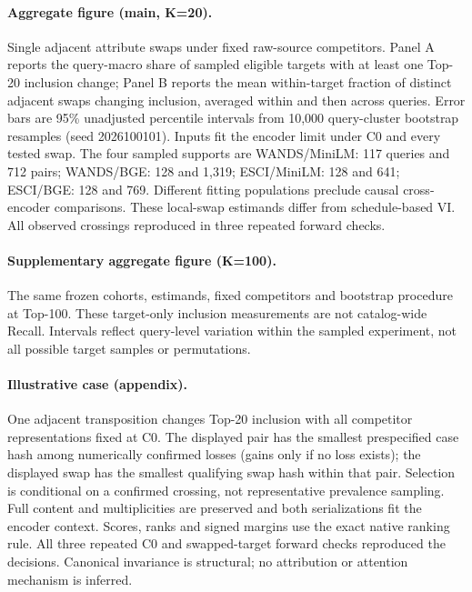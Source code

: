 \paragraph{Aggregate figure (main, K=20).}
Single adjacent attribute swaps under fixed raw-source competitors. Panel A reports the query-macro share of sampled eligible targets with at least one Top-20 inclusion change; Panel B reports the mean within-target fraction of distinct adjacent swaps changing inclusion, averaged within and then across queries. Error bars are 95\% unadjusted percentile intervals from 10,000 query-cluster bootstrap resamples (seed 2026100101). Inputs fit the encoder limit under C0 and every tested swap. The four sampled supports are WANDS/MiniLM: 117 queries and 712 pairs; WANDS/BGE: 128 and 1,319; ESCI/MiniLM: 128 and 641; ESCI/BGE: 128 and 769. Different fitting populations preclude causal cross-encoder comparisons. These local-swap estimands differ from schedule-based VI. All observed crossings reproduced in three repeated forward checks.

\paragraph{Supplementary aggregate figure (K=100).}
The same frozen cohorts, estimands, fixed competitors and bootstrap procedure at Top-100. These target-only inclusion measurements are not catalog-wide Recall. Intervals reflect query-level variation within the sampled experiment, not all possible target samples or permutations.

\paragraph{Illustrative case (appendix).}
One adjacent transposition changes Top-20 inclusion with all competitor representations fixed at C0. The displayed pair has the smallest prespecified case hash among numerically confirmed losses (gains only if no loss exists); the displayed swap has the smallest qualifying swap hash within that pair. Selection is conditional on a confirmed crossing, not representative prevalence sampling. Full content and multiplicities are preserved and both serializations fit the encoder context. Scores, ranks and signed margins use the exact native ranking rule. All three repeated C0 and swapped-target forward checks reproduced the decisions. Canonical invariance is structural; no attribution or attention mechanism is inferred.
